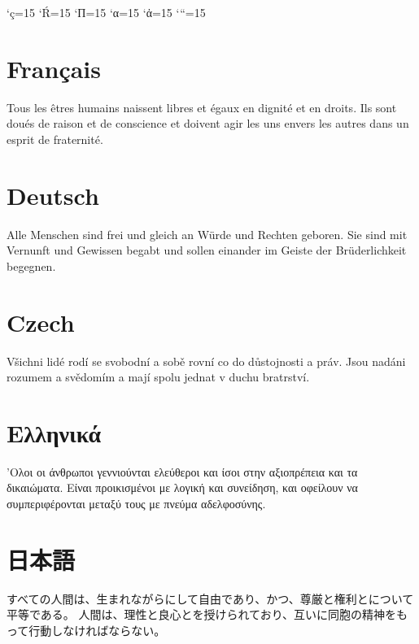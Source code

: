 \documentclass{ujarticle}
\begin{document}
\kcatcode`ç=15%
\kcatcode`Ŕ=15
\kcatcode`П=15
\kcatcode`α=15
\kcatcode`ἀ=15
\kcatcode`“=15

\section{Français}
Tous les êtres humains naissent libres et égaux en dignité et en droits.
Ils sont doués de raison et de conscience et doivent agir les uns envers les autres dans un esprit de fraternité.

\section{Deutsch}
Alle Menschen sind frei und gleich an Würde und Rechten geboren.
Sie sind mit Vernunft und Gewissen begabt und sollen einander im Geiste der Brüderlichkeit begegnen.

%
\section{Czech}
Všichni lidé rodí se svobodní a sobě rovní co do důstojnosti a práv.
Jsou nadáni rozumem a svědomím a mají spolu jednat v duchu bratrství. 

\selectfont

\section{Ελληνικά}
'Ολοι οι άνθρωποι γεννιούνται ελεύθεροι και ίσοι στην αξιοπρέπεια και τα δικαιώματα.
Είναι προικισμένοι με λογική και συνείδηση, και οφείλουν να συμπεριφέρονται μεταξύ τους με πνεύμα αδελφοσύνης.

\section{日本語}
すべての人間は、生まれながらにして自由であり、かつ、尊厳と権利とについて平等である。
人間は、理性と良心とを授けられており、互いに同胞の精神をもって行動しなければならない。 
\end{document}
